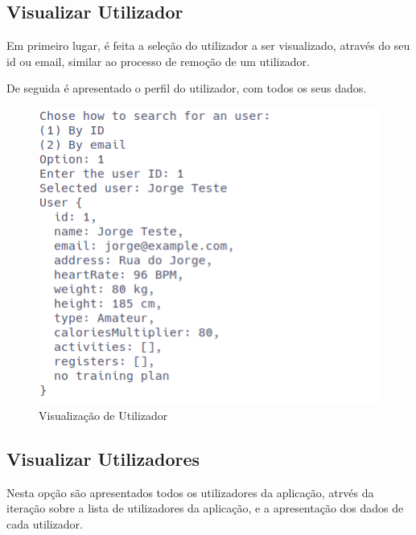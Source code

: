 \documentclass[a4paper,12pt]{scrreprt}
\begin{document}
    \clearpage
    \subsection{Visualizar Utilizador}
    Em primeiro lugar, é feita a seleção do utilizador a ser visualizado, através do seu id ou email,
    similar ao processo de remoção de um utilizador.

    De seguida é apresentado o perfil do utilizador, com todos os seus dados.

    \begin{figure}[!ht]
        \centering
        \includegraphics[width=\textwidth]{images/viewUser.png}
        \caption{Visualização de Utilizador}
        \label{fig:view-user}
    \end{figure}

    \clearpage
    \subsection{Visualizar Utilizadores}
    Nesta opção são apresentados todos os utilizadores da aplicação,
    atrvés da iteração sobre a lista de utilizadores da aplicação,
    e a apresentação dos dados de cada utilizador.
\end{document}
